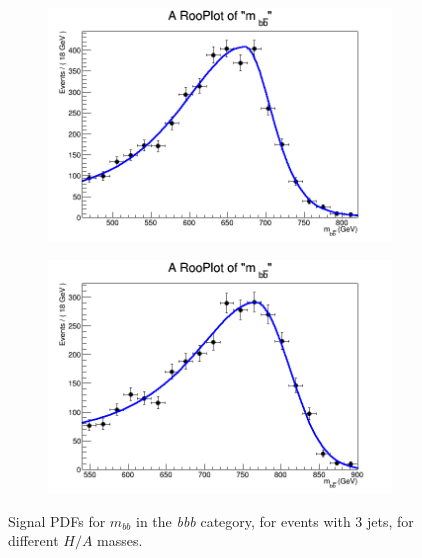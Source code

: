 \begin{figure}[phtb!]
\begin{center}
  \begin{subfigure}[$m_{A}=700$ GeV]{0.4\textwidth}\includegraphics[width=\textwidth]{FitResults/images/fitMC_bAbb700_1.png}\end{subfigure}
  \begin{subfigure}[$m_{A}=800$ GeV]{0.4\textwidth}\includegraphics[width=\textwidth]{FitResults/images/fitMC_bAbb800_1.png}\end{subfigure}
  \caption{Signal PDFs for $m_{bb}$ in the {\it bbb} category, for events with 3 jets, for different $H/A$ masses. \label{fig:signalPDFs_3j}}
    \end{center}
\end{figure}


